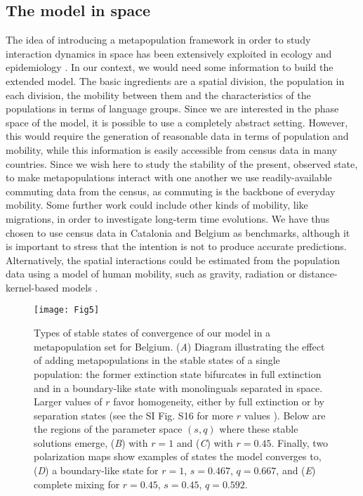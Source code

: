 \documentclass[../thesis.tex]{subfiles}
\begin{document}
\subsection{The model in space}

The idea of introducing a metapopulation framework in order to study interaction
dynamics in space has been extensively exploited in ecology
\cite{HanskiMetapopulationDynamics1998} and epidemiology
\cite{SattenspielStructuredEpidemic1995,BalcanModelingSpatial2010}. In our context, we
would need some information to build the extended model. The basic ingredients are a
spatial division, the population in each division, the mobility between them and the
characteristics of the populations in terms of language groups. Since we are interested
in the phase space of the model, it is possible to use a completely abstract setting.
However, this would require the generation of reasonable data in terms of population and
mobility, while this information is easily accessible from census data in many
countries. Since we wish here to study the stability of the present, observed state, to
make metapopulations interact with one another we use readily-available commuting data
from the census, as commuting is the backbone of everyday mobility. Some further work
could include other kinds of mobility, like migrations, in order to investigate
long-term time evolutions. We have thus chosen to use census data in Catalonia and
Belgium as benchmarks, although it is important to stress that the intention is not to
produce accurate predictions. Alternatively, the spatial interactions could be estimated
from the population data using a model of human mobility, such as gravity, radiation or
distance-kernel-based models
\cite{BarbosaHumanMobility2018,BurridgeSpatialEvolution2017,BurridgeInferringDrivers2021}.

\begin{figure}[hp!]
\centering
    \texttt{[image: Fig5]}
    \caption{Types of stable states of convergence of our model in a metapopulation set
    for Belgium. (\textit{A}) Diagram illustrating the effect of adding metapopulations
    in the stable states of a single population: the former extinction state bifurcates
    in full extinction and in a boundary-like state with monolinguals separated in
    space. Larger values of $r$ favor homogeneity, either by full extinction or by
    separation states (see the SI Fig. S16 for more $r$ values \cite{supp}). Below are
    the regions of the parameter space $(s,q)$ where these stable solutions emerge,
    (\textit{B}) with $r=1$ and (\textit{C}) with $r=0.45$. Finally, two polarization
    maps show examples of states the model converges to, (\textit{D}) a boundary-like
    state for $r=1$, $s=0.467$, $q=0.667$, and (\textit{E}) complete mixing for
    $r=0.45$, $s=0.45$, $q=0.592$.}
    \label{fig:single_to_metapop_BE}
\end{figure}
\end{document}
